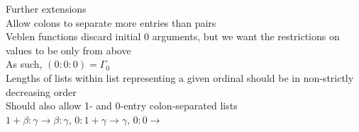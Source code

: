 \documentclass{article}
\begin{document}
\newpage

Further extensions \\
Allow colons to separate more entries than pairs \\
Veblen functions discard initial 0 arguments,
but we want the restrictions on values to be only from above \\
As such, $(0:0:0) = \Gamma_0$ \\
Lengths of lists within list representing a given ordinal
should be in non-strictly decreasing order \\
Should also allow 1- and 0-entry colon-separated lists \\
$1+\beta : \gamma \rightarrow \beta : \gamma$,
$0 : 1+\gamma \rightarrow \gamma$,
$0 : 0 \rightarrow$


\end{document}
